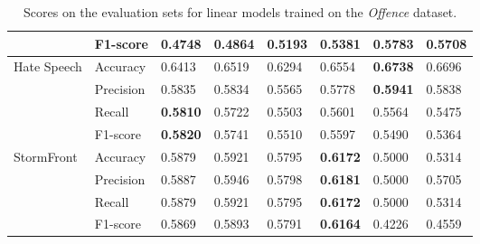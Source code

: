 \begin{table}[]
\begin{minipage}{0.42\paperheight}
{\begin{tabular}{ll|ll|ll|ll}
                                        & F1-score  & 0.4748      & 0.4864       & 0.5193 & 0.5381          & \bf{0.5783} & 0.5708      \\ \hline
      \multirow{4}{*}{Hate Speech}      & Accuracy  & 0.6413      & 0.6519       & 0.6294 & 0.6554          & \bf{0.6738} & 0.6696      \\
                                        & Precision & 0.5835      & 0.5834       & 0.5565 & 0.5778          & \bf{0.5941} & 0.5838      \\
                                        & Recall    & \bf{0.5810} & 0.5722       & 0.5503 & 0.5601          & 0.5564      & 0.5475      \\
                                        & F1-score  & \bf{0.5820} & 0.5741       & 0.5510 & 0.5597          & 0.5490      & 0.5364      \\ \hline
      \multirow{4}{*}{StormFront}       & Accuracy  & 0.5879      & 0.5921       & 0.5795 & \bf{0.6172}     & 0.5000      & 0.5314      \\
                                        & Precision & 0.5887      & 0.5946       & 0.5798 & \bf{0.6181}     & 0.5000      & 0.5705      \\
                                        & Recall    & 0.5879      & 0.5921       & 0.5795 & \bf{0.6172}     & 0.5000      & 0.5314      \\
                                        & F1-score  & 0.5869      & 0.5893       & 0.5791 & \bf{0.6164}     & 0.4226      & 0.4559
    \end{tabular}%
    }
    \caption{Scores on the evaluation sets for linear models trained on the \textit{Offence} dataset.}
    \label{tab:linear_offence_baselines}
    \vfill
\end{minipage}
\end{table}
